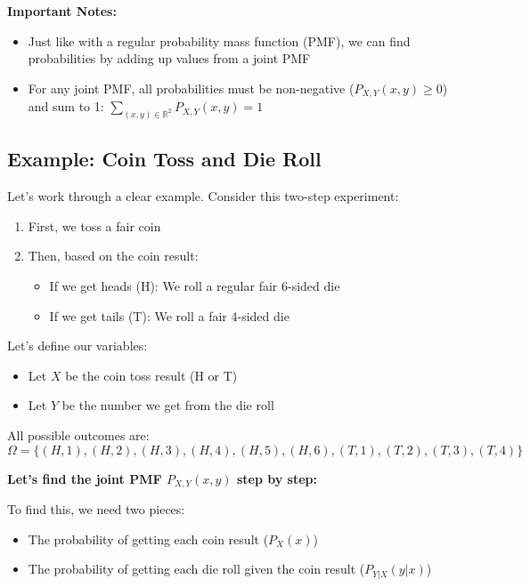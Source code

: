 \documentclass{article}
\begin{document}
    \textbf{Important Notes:} 
    \begin{itemize}
        \item Just like with a regular probability mass function (PMF), we can find probabilities by adding up values from a joint PMF
        \item For any joint PMF, all probabilities must be non-negative ($P_{X,Y}(x,y) \geq 0$) and sum to 1: $\sum_{(x, y) \in \mathbb{R}^2} P_{X,Y}(x,y) = 1$
    \end{itemize}

    \subsection*{Example: Coin Toss and Die Roll}
    Let's work through a clear example. Consider this two-step experiment:
    \begin{enumerate}
        \item First, we toss a fair coin
        \item Then, based on the coin result:
            \begin{itemize}
                \item If we get heads (H): We roll a regular fair 6-sided die
                \item If we get tails (T): We roll a fair 4-sided die
            \end{itemize}
    \end{enumerate}

    Let's define our variables:
    \begin{itemize}
        \item Let $X$ be the coin toss result (H or T)
        \item Let $Y$ be the number we get from the die roll
    \end{itemize}

    All possible outcomes are:
    \[ \Omega = \{(H,1), (H,2), (H,3), (H,4), (H,5), (H,6), (T,1), (T,2), (T,3), (T,4)\} \]

    \textbf{Let's find the joint PMF $P_{X,Y}(x,y)$ step by step:}

    To find this, we need two pieces:
    \begin{itemize}
        \item The probability of getting each coin result ($P_X(x)$)
        \item The probability of getting each die roll given the coin result ($P_{Y|X}(y|x)$)
    \end{itemize}
\end{document}
